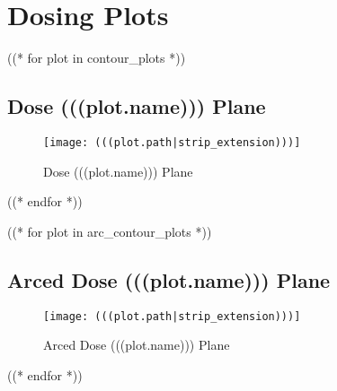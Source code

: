 \documentclass[12pt]{article}
\begin{document}
\section{Dosing Plots}

((* for plot in contour_plots *))
	\subsection{Dose (((plot.name))) Plane}
	\begin{figure}[H]
	\centering
	\texttt{[image: (((plot.path|strip\_extension)))]}
	\caption{Dose (((plot.name))) Plane}
	\label{fig:(((plot.slug)))}
	\end{figure}
((* endfor *))


((* for plot in arc_contour_plots *))
	\subsection{Arced Dose (((plot.name))) Plane}
	\begin{figure}[H]
	\centering
	\texttt{[image: (((plot.path|strip\_extension)))]}
	\caption{Arced Dose (((plot.name))) Plane}
	\label{fig:(((plot.slug)))}
	\end{figure}
((* endfor *))
\end{document}
